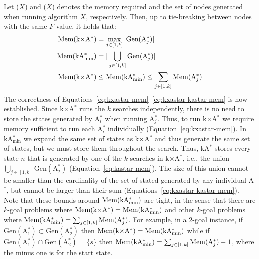 \documentclass[smallextended]{svjour3}       %
\newcommand{\astar}{A$^*$\xspace}
\newcommand{\kastar}{kA$^*$\xspace}
\newcommand{\kastarvar}[1]{\textup{kA}$^*_{#1}$\xspace}
\newcommand{\kastarmin}{\kastarvar{\min}}
\newcommand{\kxastar}{k$\times$A$^*$\xspace}
\newcommand{\astari}[1]{A$^*_{#1}$\xspace}
\newcommand{\Gen}{\text{Gen}}
\newcommand{\Mem}{\text{Mem}}
\begin{document}
Let \Mem($X$) and \Gen($X$) denotes the memory required and the set of nodes generated when running algorithm $X$, respectively. Then, up to tie-breaking between nodes with the same $F$ value, it holds that:
\begin{align}
\Mem(\text{\kxastar})&=\max_{j\in [1,k]}| \Gen(\text{\astari{j}})| \label{eq:kxastar-mem}\\
\Mem(\text{\kastarmin})&=|\bigcup_{j\in [1,k]} \Gen(\text{\astari{j}})| \label{eq:kastar-mem}\\
\Mem(\text{\kxastar})&\leq \Mem(\text{\kastarmin}) \leq \sum_{j\in[1,k]} \Mem(\text{\astari{j}}) \label{eq:kxastar-kastar-mem}
\end{align}
The correctness of Equations~\eqref{eq:kxastar-mem}--\eqref{eq:kxastar-kastar-mem} is now established.
Since \kxastar runs the $k$ searches independently, there is no need to store the states generated by \astari{i} when running \astari{j}.
Thus, to run \kxastar we require memory sufficient to run each \astari{i} individually (Equation~\eqref{eq:kxastar-mem}).
In \kastarmin we expand the same set of states as \kxastar and thus generate the same set of states, but we must store them throughout the search.
Thus, \kastar stores every state $n$ that is  generated by one of the $k$ searches in \kxastar, i.e., the union $\bigcup_{j\in[1,k]}\Gen(\text{\astari{j}})$ (Equation~\eqref{eq:kastar-mem}).
The size of this union cannot be smaller than the cardinality of the set of stated generated by any individual \astar, but cannot be larger than their sum (Equations~\eqref{eq:kxastar-kastar-mem}).
Note that these bounds around $\Mem(\text{\kastarmin})$ 
are tight, in the sense that there are $k$-goal problems where $\Mem(\text{\kxastar}) = \Mem(\text{\kastarmin})$ and other $k$-goal problems where $\Mem(\text{\kastarmin}) = \sum_{j\in[1,k]} \Mem(\text{\astari{j}})$.
For example, in a 2-goal instance, if $\Gen(\text{\astari{1}})\subset \Gen(\text{\astari{2}})$ then $\Mem(\text{\kxastar}) = \Mem(\text{\kastarmin})$ while if $\Gen(\text{\astari{1}})\cap \Gen(\text{\astari{2}})=\{s\}$ then $\Mem(\text{\kastarmin}) = \sum_{j\in[1,k]} \Mem(\text{\astari{j}})-1$, where the minus one is for the start state. %
\end{document}
